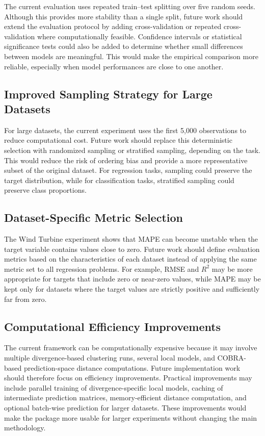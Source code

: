 \hs The current evaluation uses repeated train--test splitting over five random seeds. Although this provides more stability than a single split, future work should extend the evaluation protocol by adding cross-validation or repeated cross-validation where computationally feasible. Confidence intervals or statistical significance tests could also be added to determine whether small differences between models are meaningful. This would make the empirical comparison more reliable, especially when model performances are close to one another.

\subsection{Improved Sampling Strategy for Large Datasets}

\hs For large datasets, the current experiment uses the first 5,000 observations to reduce computational cost. Future work should replace this deterministic selection with randomized sampling or stratified sampling, depending on the task. This would reduce the risk of ordering bias and provide a more representative subset of the original dataset. For regression tasks, sampling could preserve the target distribution, while for classification tasks, stratified sampling could preserve class proportions.

\subsection{Dataset-Specific Metric Selection}

\hs The Wind Turbine experiment shows that MAPE can become unstable when the target variable contains values close to zero. Future work should define evaluation metrics based on the characteristics of each dataset instead of applying the same metric set to all regression problems. For example, RMSE and $R^2$ may be more appropriate for targets that include zero or near-zero values, while MAPE may be kept only for datasets where the target values are strictly positive and sufficiently far from zero.

\subsection{Computational Efficiency Improvements}

\hs The current framework can be computationally expensive because it may involve multiple divergence-based clustering runs, several local models, and COBRA-based prediction-space distance computations. Future implementation work should therefore focus on efficiency improvements. Practical improvements may include parallel training of divergence-specific local models, caching of intermediate prediction matrices, memory-efficient distance computation, and optional batch-wise prediction for larger datasets. These improvements would make the package more usable for larger experiments without changing the main methodology.

